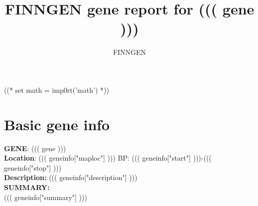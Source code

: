 \documentclass{article}
\begin{document}
\title {FINNGEN gene report for ((( gene ))) }
\author{FINNGEN}
\maketitle
\newpage
\newpage
((* set math = imp0rt('math') *))
\section{ Basic gene info }
\textbf{GENE}: ((( gene ))) \\
\medskip
\textbf{Location}: ((( geneinfo["maploc"] ))) BP: ((( geneinfo["start"] )))-((( geneinfo["stop"] ))) \\
\medskip
\textbf{Description:} ((( geneinfo["description"] ))) \\
\medskip
\textbf{SUMMARY:} \\
((( geneinfo["summary"] )))
\newpage
\end{document}
